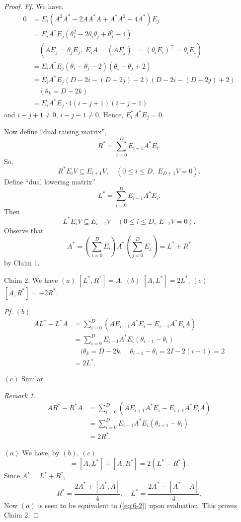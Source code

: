 \documentclass[
]{book}
\theoremstyle{definition}
\theoremstyle{definition}
\theoremstyle{definition}
\theoremstyle{definition}
\theoremstyle{remark}
\newtheorem*{remark}{Remark}
\begin{document}
\begin{proof}
\emph{Pf.} We have,
\begin{align}
0 & = E_i(A^2A^* - 2AA^*A + A^*A^2 - 4A^*)E_j\\
& = E_iA^*E_j(\theta_i^2 - 2\theta_i\theta_j + \theta_j^2 - 4)\\
& \quad (AE_j = \theta_jE_j, \; E_iA = (AE_j)^\top = (\theta_iE_i)^\top = \theta_iE_i)\\
& = E_iA^*E_j(\theta_i - \theta_j -2)(\theta_i - \theta_j + 2)\\
& = E_iA^*E_j(D-2i - (D-2j)-2)(D-2i - (D-2j) + 2)\\
& \quad (\theta_k = D-2k)\\
& = E_iA^*E_j \cdot 4(i-j+1)(i-j-1)
\end{align}
and \(i-j+1 \neq 0\), \(i-j-1\neq 0\).
Hence, \(E_i^*A^*E_j = 0\).

Now define ``dual raising matrix'',
\[R^* = \sum_{i=0}^D E_{i+1}A^*E_i.\]
So,
\[R^*E_iV \subseteq E_{i+1}V, \quad (0\leq i\leq D, \; E_{D+1}V = 0).\]
Define ``dual lowering matrix''
\[L^* = \sum_{i=0}^D E_{i-1}A^*E_i.\]
Then
\[L^*E_iV \subseteq E_{i-1}V \quad (0\leq i\leq D, \; E_{-1}V = 0).\]
Observe that
\[A^* = \left(\sum_{i=0}^DE_i\right)A^*\left(\sum_{j=0}^DE_j\right) = L^* + R^*\]
by Claim 1.

Claim 2. We have
\textbar{} \((a)\) \([L^*, R^*] = A\),
\textbar{} \((b)\) \([A, L^*] = 2L^*\),
\textbar{} \((c)\) \([A, R^*] = -2R^*\).

\emph{Pf.}
\((b)\)
\begin{align}
AL^* - L^*A & = \sum_{i=0}^D(AE_{i-1}A^*E_i - E_{i-1}A^*E_iA)\\
& = \sum_{i=0}^D E_{i-1}A^*E_i (\theta_{i-1} - \theta_i)\\
& \quad (\theta_k = D-2k, \quad \theta_{i-1}- \theta_i = 2I - 2(i-1) = 2\\
& = 2L^*.
\end{align}

\((c)\) Similar.

\begin{remark}
\begin{align}
AR^* - R^*A & = \sum_{i=0}^D (AE_{i+1}A^*E_i - E_{i+1}A^*E_iA)\\
& = \sum_{i=0}^D E_{i+1}A^*E_i (\theta_{i+1} - \theta_i)\\
& = 2R^*.
\end{align}
\end{remark}

\((a)\) We have, by \((b)\), \((c)\)
\begin{equation}
[A, A^*] = [A, L^*] + [A, R^*] = 2(L^* - R^*).
\end{equation}
Since \(A^* = L^* + R^*\),
\[R^* = \frac{2A^* + [A^*, A]}{4}, \quad L^* = \frac{2A^* - [A^* - A]}{4}.\]
Now \((a)\) is seen to be equivalent to (\eqref{eq:6-2}) upon evaluation.
This proves Claim 2.


\end{proof}
\end{document}
